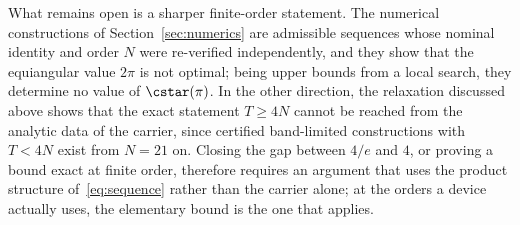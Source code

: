What remains open is a sharper finite-order statement. The numerical constructions of
Section~\ref{sec:numerics} are admissible sequences whose nominal identity and order $N$
were re-verified independently, and they show that the equiangular value
$2\pi$ is not optimal; being upper bounds from a local search, they determine no value of $\cstar(\pi)$. In the other direction, the
relaxation discussed above shows that the exact statement $T\ge4N$ cannot be reached from
the analytic data of the carrier, since certified band-limited constructions with $T<4N$
exist from $N=21$ on. Closing the gap between $4/e$ and $4$, or proving a bound exact at
finite order, therefore requires an argument that uses the product structure of~\eqref{eq:sequence} rather than the carrier alone; at the orders a device actually uses,
the elementary bound is the one that applies.
